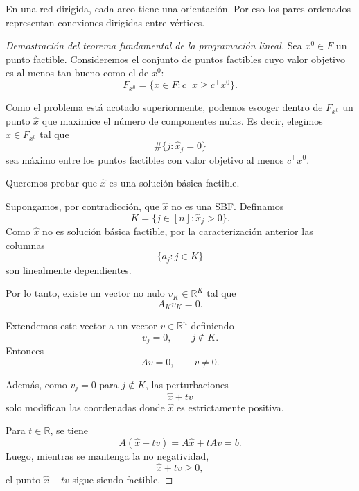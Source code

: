 \begin{remark}
En una red dirigida, cada arco tiene una orientación. Por eso los pares ordenados representan conexiones dirigidas entre vértices.
\end{remark}



\begin{proof}[Demostración del teorema fundamental de la programación lineal]
Sea \(x^0\in F\) un punto factible. Consideremos el conjunto de puntos factibles cuyo valor objetivo es al menos tan bueno como el de \(x^0\):
\[
    F_{x^0}
    =
    \{x\in F:c^\top x\geq c^\top x^0\}.
\]

Como el problema está acotado superiormente, podemos escoger dentro de \(F_{x^0}\) un punto \(\widehat{x}\) que maximice el número de componentes nulas. Es decir, elegimos \(\widehat{x}\in F_{x^0}\) tal que
\[
    \#\{j:\widehat{x}_j=0\}
\]
sea máximo entre los puntos factibles con valor objetivo al menos \(c^\top x^0\).

Queremos probar que \(\widehat{x}\) es una solución básica factible.

Supongamos, por contradicción, que \(\widehat{x}\) no es una SBF. Definamos
\[
    K
    =
    \{j\in[n]:\widehat{x}_j>0\}.
\]
Como \(\widehat{x}\) no es solución básica factible, por la caracterización anterior las columnas
\[
    \{a_j:j\in K\}
\]
son linealmente dependientes.

Por lo tanto, existe un vector no nulo \(v_K\in\mathbb{R}^{K}\) tal que
\[
    A_Kv_K=0.
\]

Extendemos este vector a un vector \(v\in\mathbb{R}^n\) definiendo
\[
    v_j=0,
    \qquad
    j\notin K.
\]
Entonces
\[
    Av=0,
    \qquad
    v\neq 0.
\]

Además, como \(v_j=0\) para \(j\notin K\), las perturbaciones
\[
    \widehat{x}+tv
\]
solo modifican las coordenadas donde \(\widehat{x}\) es estrictamente positiva.

Para \(t\in\mathbb{R}\), se tiene
\[
    A(\widehat{x}+tv)
    =
    A\widehat{x}+tAv
    =
    b.
\]
Luego, mientras se mantenga la no negatividad,
\[
    \widehat{x}+tv\geq 0,
\]
el punto \(\widehat{x}+tv\) sigue siendo factible.


\end{proof}
